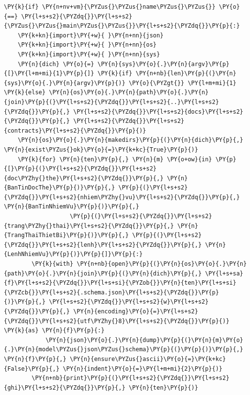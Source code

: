 \begin{Verbatim}[commandchars=\\\{\},frame=single,framerule=0.3pt,rulecolor=\color{black!40},fontsize=\footnotesize,breaklines=true]
\PY{k}{if} \PY{n+nv+vm}{\PYZus{}\PYZus{}name\PYZus{}\PYZus{}} \PY{o}{==} \PY{l+s+s2}{\PYZdq{}}\PY{l+s+s2}{\PYZus{}\PYZus{}main\PYZus{}\PYZus{}}\PY{l+s+s2}{\PYZdq{}}\PY{p}{:}
    \PY{k+kn}{import}\PY{+w}{ }\PY{n+nn}{json}
    \PY{k+kn}{import}\PY{+w}{ }\PY{n+nn}{os}
    \PY{k+kn}{import}\PY{+w}{ }\PY{n+nn}{sys}
    \PY{n}{dich} \PY{o}{=} \PY{n}{sys}\PY{o}{.}\PY{n}{argv}\PY{p}{[}\PY{l+m+mi}{1}\PY{p}{]} \PY{k}{if} \PY{n+nb}{len}\PY{p}{(}\PY{n}{sys}\PY{o}{.}\PY{n}{argv}\PY{p}{)} \PY{o}{\PYZgt{}} \PY{l+m+mi}{1} \PY{k}{else} \PY{n}{os}\PY{o}{.}\PY{n}{path}\PY{o}{.}\PY{n}{join}\PY{p}{(}\PY{l+s+s2}{\PYZdq{}}\PY{l+s+s2}{..}\PY{l+s+s2}{\PYZdq{}}\PY{p}{,} \PY{l+s+s2}{\PYZdq{}}\PY{l+s+s2}{docs}\PY{l+s+s2}{\PYZdq{}}\PY{p}{,} \PY{l+s+s2}{\PYZdq{}}\PY{l+s+s2}{contracts}\PY{l+s+s2}{\PYZdq{}}\PY{p}{)}
    \PY{n}{os}\PY{o}{.}\PY{n}{makedirs}\PY{p}{(}\PY{n}{dich}\PY{p}{,} \PY{n}{exist\PYZus{}ok}\PY{o}{=}\PY{k+kc}{True}\PY{p}{)}
    \PY{k}{for} \PY{n}{ten}\PY{p}{,} \PY{n}{m} \PY{o+ow}{in} \PY{p}{[}\PY{p}{(}\PY{l+s+s2}{\PYZdq{}}\PY{l+s+s2}{doc\PYZhy{}the}\PY{l+s+s2}{\PYZdq{}}\PY{p}{,} \PY{n}{BanTinDocThe}\PY{p}{)}\PY{p}{,} \PY{p}{(}\PY{l+s+s2}{\PYZdq{}}\PY{l+s+s2}{nhiem\PYZhy{}vu}\PY{l+s+s2}{\PYZdq{}}\PY{p}{,} \PY{n}{BanTinNhiemVu}\PY{p}{)}\PY{p}{,}
                   \PY{p}{(}\PY{l+s+s2}{\PYZdq{}}\PY{l+s+s2}{trang\PYZhy{}thai}\PY{l+s+s2}{\PYZdq{}}\PY{p}{,} \PY{n}{TrangThaiThietBi}\PY{p}{)}\PY{p}{,} \PY{p}{(}\PY{l+s+s2}{\PYZdq{}}\PY{l+s+s2}{lenh}\PY{l+s+s2}{\PYZdq{}}\PY{p}{,} \PY{n}{LenhNhiemVu}\PY{p}{)}\PY{p}{]}\PY{p}{:}
        \PY{k}{with} \PY{n+nb}{open}\PY{p}{(}\PY{n}{os}\PY{o}{.}\PY{n}{path}\PY{o}{.}\PY{n}{join}\PY{p}{(}\PY{n}{dich}\PY{p}{,} \PY{l+s+sa}{f}\PY{l+s+s2}{\PYZdq{}}\PY{l+s+si}{\PYZob{}}\PY{n}{ten}\PY{l+s+si}{\PYZcb{}}\PY{l+s+s2}{.schema.json}\PY{l+s+s2}{\PYZdq{}}\PY{p}{)}\PY{p}{,} \PY{l+s+s2}{\PYZdq{}}\PY{l+s+s2}{w}\PY{l+s+s2}{\PYZdq{}}\PY{p}{,} \PY{n}{encoding}\PY{o}{=}\PY{l+s+s2}{\PYZdq{}}\PY{l+s+s2}{utf\PYZhy{}8}\PY{l+s+s2}{\PYZdq{}}\PY{p}{)} \PY{k}{as} \PY{n}{f}\PY{p}{:}
            \PY{n}{json}\PY{o}{.}\PY{n}{dump}\PY{p}{(}\PY{n}{m}\PY{o}{.}\PY{n}{model\PYZus{}json\PYZus{}schema}\PY{p}{(}\PY{p}{)}\PY{p}{,} \PY{n}{f}\PY{p}{,} \PY{n}{ensure\PYZus{}ascii}\PY{o}{=}\PY{k+kc}{False}\PY{p}{,} \PY{n}{indent}\PY{o}{=}\PY{l+m+mi}{2}\PY{p}{)}
        \PY{n+nb}{print}\PY{p}{(}\PY{l+s+s2}{\PYZdq{}}\PY{l+s+s2}{ghi}\PY{l+s+s2}{\PYZdq{}}\PY{p}{,} \PY{n}{ten}\PY{p}{)}
\end{Verbatim}
